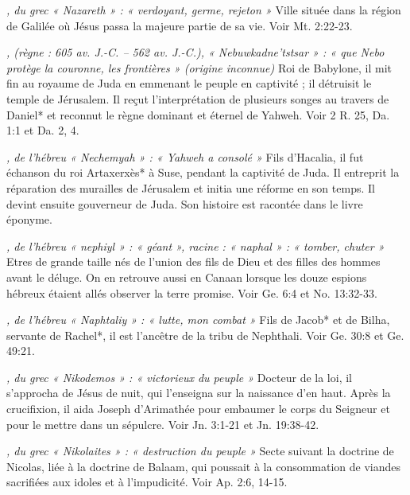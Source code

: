 \begin{multicols}{2}
{\textit{, du grec « Nazareth » : « verdoyant, germe, rejeton »}\newline
Ville située dans la région de Galilée où Jésus passa la majeure partie de sa vie. Voir Mt. 2:22-23.

\textit{, (règne : 605 av. J.-C. – 562 av. J.-C.), « Nebuwkadne'tstsar » : « que Nebo protège la couronne, les frontières » (origine inconnue)}\newline
Roi de Babylone, il mit fin au royaume de Juda en emmenant le peuple en captivité ; il détruisit le temple de Jérusalem. Il reçut l'interprétation de plusieurs songes au travers de Daniel* et reconnut le règne dominant et éternel de Yahweh. Voir 2 R. 25, Da. 1:1 et Da. 2, 4.

\textit{, de l'hébreu « Nechemyah » : « Yahweh a consolé »}\newline
Fils d'Hacalia, il fut échanson du roi Artaxerxès* à Suse, pendant la captivité de Juda. Il entreprit la réparation des murailles de Jérusalem et initia une réforme en son temps. Il devint ensuite gouverneur de Juda. Son histoire est racontée dans le livre éponyme.

\textit{, de l'hébreu « nephiyl » : « géant », racine : « naphal » : « tomber, chuter »}\newline
Etres de grande taille nés de l'union des fils de Dieu et des filles des hommes avant le déluge. On en retrouve aussi en Canaan lorsque les douze espions hébreux étaient allés observer la terre promise. Voir Ge. 6:4 et No. 13:32-33.

\textit{, de l'hébreu « Naphtaliy » : « lutte, mon combat »}\newline
Fils de Jacob* et de Bilha, servante de Rachel*, il est l'ancêtre de la tribu de Nephthali. Voir Ge. 30:8 et Ge. 49:21.

\textit{, du grec « Nikodemos » : « victorieux du peuple »}\newline
Docteur de la loi, il s'approcha de Jésus de nuit, qui l'enseigna sur la naissance d'en haut. Après la crucifixion, il aida Joseph d'Arimathée pour embaumer le corps du Seigneur et pour le mettre dans un sépulcre. Voir Jn. 3:1-21 et Jn. 19:38-42.

\textit{, du grec « Nikolaites » : « destruction du peuple »}\newline
Secte suivant la doctrine de Nicolas, liée à la doctrine de Balaam, qui poussait à la consommation de viandes sacrifiées aux idoles et à l'impudicité. Voir Ap. 2:6, 14-15.

}
\end{multicols}
